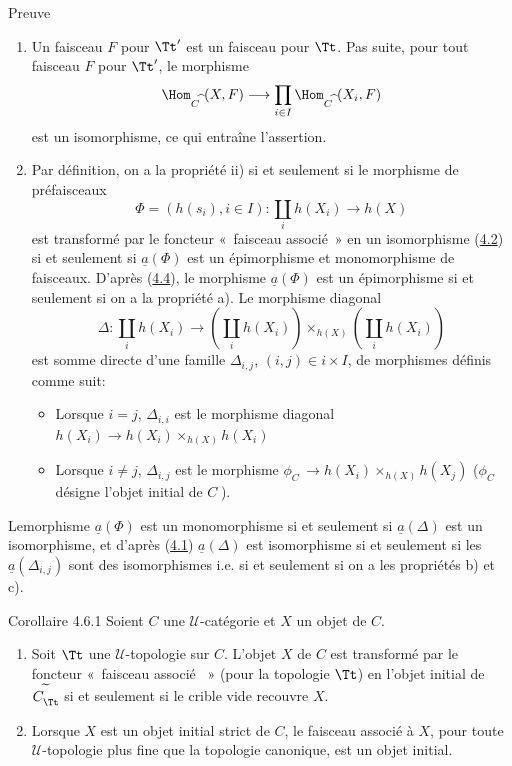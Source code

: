 \begin{enonce*}[remark]{Preuve}
\begin{enumerate}
\renewcommand{\labelenumi}{\theenumi)}
\item Un faisceau $F$ pour $\Tt'$ est un faisceau pour
  $\Tt$. Pas suite, pour tout faisceau $F$ pour
  $\Tt'$, le morphisme
$$
\Hom_{C^{\widehat{\phantom{,}}}}(X,F)\longrightarrow \prod_{i\in I}
\Hom_{C^{\widehat{\phantom{,}}}}(X_i,F)
$$
est un isomorphisme, ce qui entraîne l'assertion.

\item Par définition, on a la propriété ii) si et seulement si
  le morphisme de préfaisceaux
$$
\Phi=(h(s_i),i\in I):\coprod_i h(X_i)\longrightarrow h(X)
$$
est transformé par le foncteur « faisceau associé » en un
isomorphisme \ie (\hyperref[II.prop4.2]{4.2}) si et seulement si
$\underline{a}(\Phi)$ est un épimorphisme et monomorphisme de faisceaux.
D'après (\hyperref[II.theo4.4]{4.4}), le morphisme $\underline{a}(\Phi)$ est un
épimorphisme si et seulement si on a la propriété a). Le morphisme
diagonal
$$
\Delta:\coprod_i h(X_i)\longrightarrow (\coprod_i
h(X_i))\times_{h(X)}(\coprod_i h(X_i))
$$
est somme directe d'une famille $\Delta_{i,j}$, $(i,j)\in i\times
I$, de morphismes définis comme suit:
\begin{itemize}
\item[$\beta)$] Lorsque $i=j$, $\Delta_{i,i}$ est le morphisme
  diagonal $h(X_i)\rightarrow h(X_i)\times_{h(X)}h(X_i)$

\item[$\gamma)$] Lorsque $i\neq j$, $\Delta_{i,j}$ est le morphisme
  $\phi_{C^{\widehat{\phantom{,}}}}\rightarrow
  h(X_i)\times_{h(X)}h(X_j)$ ($\phi_{C^{\widehat{\phantom{,}}}}$
  désigne l'objet initial de $C^{\widehat{\phantom{,}}}$).
\end{itemize}
\end{enumerate}
\end{enonce*}

Le\pageoriginale morphisme $\underline{a}(\Phi)$ est un monomorphisme si
et seulement si $\underline{a}(\Delta)$ est un isomorphisme, et d'après
(\hyperref[II.theo4.1]{4.1}) $\underline{a}(\Delta)$ est isomorphisme si et
seulement si les $\underline{a}(\Delta_{i,j})$ sont des isomorphismes
i.e. si et seulement si on a les propriétés b) et c).

\begin{enonce*}{Corollaire 4.6.1}
Soient $C$ une $𝒰$-catégorie et $X$ un objet de $C$.
\begin{enumerate}
\renewcommand{\labelenumi}{\theenumi)}
\item Soit $\Tt$ une $𝒰$-topologie sur $C$. L'objet
  $X$ de $C$ est transformé par le foncteur « faisceau associé
  » (pour la topologie $\Tt$) en l'objet initial de
  $C^{\widetilde{\phantom{,}}}_{\Tt}$ si et seulement si le
  crible vide recouvre $X$.

\item Lorsque $X$ est un objet initial strict de $C$, le faisceau
  associé à $X$, pour toute $𝒰$-topologie plus fine que la
  topologie canonique, est un objet initial.
\end{enumerate}
\end{enonce*}

